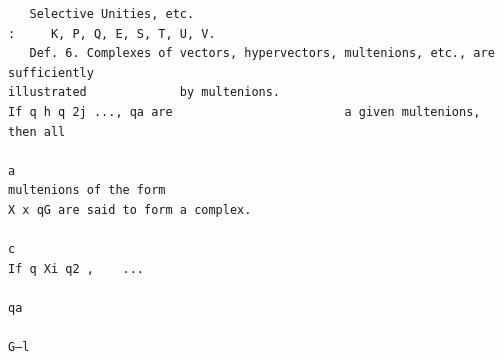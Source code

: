 \documentclass[10pt]{article}
\begin{document}
\begin{verbatim}
   Selective Unities, etc.                                            :     K, P, Q, E, S, T, U, V.
   Def. 6. Complexes of vectors, hypervectors, multenions, etc., are sufficiently
illustrated             by multenions.                                                If q h q 2j ..., qa are                        a given multenions, then all
                                                                            a
multenions of the form                                                     X x qG are said to form a complex.
                                                                                      c                                                                    If q Xi q2 ,    ...
                                                                                                                                                                                 qa
                                                                          G—l


\end{verbatim}
\clearpage
\end{document}

